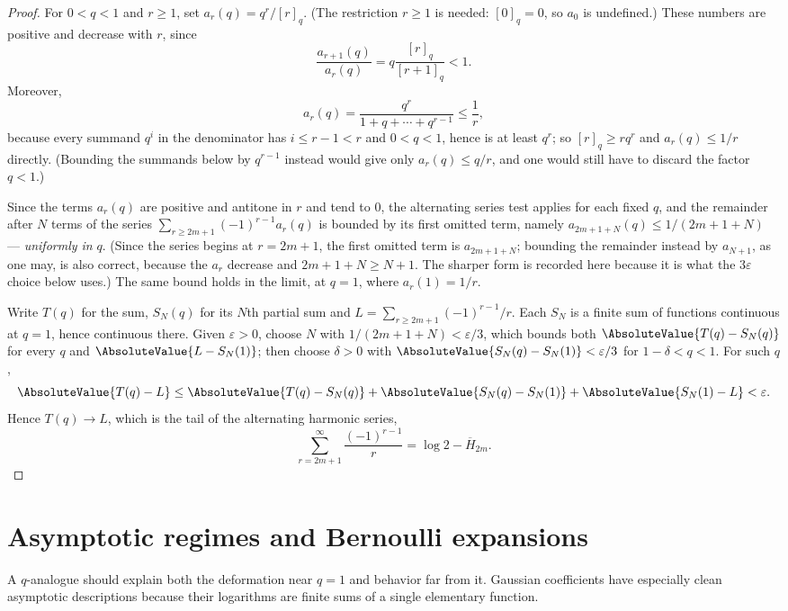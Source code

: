 \documentclass[11pt,a4paper,oneside,openany]{book}
\theoremstyle{definition}
\theoremstyle{remark}
\begin{document}
\begin{proof}
For $0<q<1$ and $r\ge1$, set $a_r(q)=q^r/[r]_q$.  (The restriction $r\ge1$ is needed:
$[0]_q=0$, so $a_0$ is undefined.)  These numbers are positive and decrease with $r$, since
\[
 \frac{a_{r+1}(q)}{a_r(q)}=q\frac{[r]_q}{[r+1]_q}<1.
\]
Moreover,
\[
 a_r(q)=\frac{q^r}{1+q+\cdots+q^{r-1}}
 \le\frac1r,
\]
because every summand $q^{i}$ in the denominator has $i\le r-1<r$ and $0<q<1$, hence is at
least $q^{r}$; so $[r]_q\ge rq^{r}$ and $a_r(q)\le1/r$ directly.  (Bounding the summands below by
$q^{r-1}$ instead would give only $a_r(q)\le q/r$, and one would still have to discard the factor
$q<1$.)

Since the terms $a_r(q)$ are positive and antitone in $r$ and tend to $0$, the alternating series
test applies for each fixed $q$, and the remainder after $N$ terms of the series
$\sum_{r\ge2m+1}(-1)^{r-1}a_r(q)$ is bounded by its first omitted term, namely
$a_{2m+1+N}(q)\le1/(2m+1+N)$ --- \emph{uniformly in} $q$.  (Since the series begins at $r=2m+1$,
the first omitted term is $a_{2m+1+N}$; bounding the remainder instead by $a_{N+1}$, as one may,
is also correct, because the $a_r$ decrease and $2m+1+N\ge N+1$.  The sharper form is recorded
here because it is what the $3\varepsilon$ choice below uses.)  The same bound holds in the limit,
at $q=1$, where $a_r(1)=1/r$.

Write $T(q)$ for the sum, $S_N(q)$ for its $N$th partial sum and $L=\sum_{r\ge2m+1}(-1)^{r-1}/r$.
Each $S_N$ is a finite sum of functions continuous at $q=1$, hence continuous there.  Given
$\varepsilon>0$, choose $N$ with $1/(2m+1+N)<\varepsilon/3$, which bounds both
$\AbsoluteValue{T(q)-S_N(q)}$ for every $q$ and $\AbsoluteValue{L-S_N(1)}$; then choose $\delta>0$
with $\AbsoluteValue{S_N(q)-S_N(1)}<\varepsilon/3$ for $1-\delta<q<1$.  For such $q$,
\[
 \AbsoluteValue{T(q)-L}
 \le\AbsoluteValue{T(q)-S_N(q)}+\AbsoluteValue{S_N(q)-S_N(1)}+\AbsoluteValue{S_N(1)-L}
 <\varepsilon .
\]
Hence $T(q)\to L$, which is the tail of the alternating harmonic series,
\[
 \sum_{r=2m+1}^{\infty}\frac{(-1)^{r-1}}r
 =\log2-\overline H_{2m}.
\]
\end{proof}

\chapter{Asymptotic regimes and Bernoulli expansions}\label{chap:asymptotics}

A $q$-analogue should explain both the deformation near $q=1$ and behavior far from it.  Gaussian coefficients have especially clean asymptotic descriptions because their logarithms are finite sums of a single elementary function.
\end{document}
